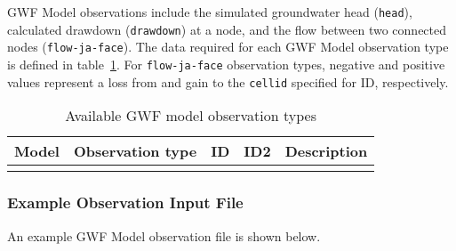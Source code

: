 
GWF Model observations include the simulated groundwater head (\texttt{head}), calculated drawdown (\texttt{drawdown}) at a node, and the flow between two connected nodes (\texttt{flow-ja-face}). The data required for each GWF Model observation type is defined in table~\ref{table:gwfobstype}. For \texttt{flow-ja-face} observation types, negative and positive values represent a loss from and gain to the \texttt{cellid} specified for ID, respectively.

\begin{longtable}{p{2cm} p{2.75cm} p{2cm} p{1.25cm} p{7cm}}
\caption{Available GWF model observation types} \tabularnewline

\hline
\hline
\textbf{Model} & \textbf{Observation type} & \textbf{ID} & \textbf{ID2} & \textbf{Description} \\
\hline
\endhead

\hline
\endfoot


\label{table:gwfobstype}
\end{longtable}

\vspace{5mm}
\subsubsection{Example Observation Input File}

An example GWF Model observation file is shown below.



